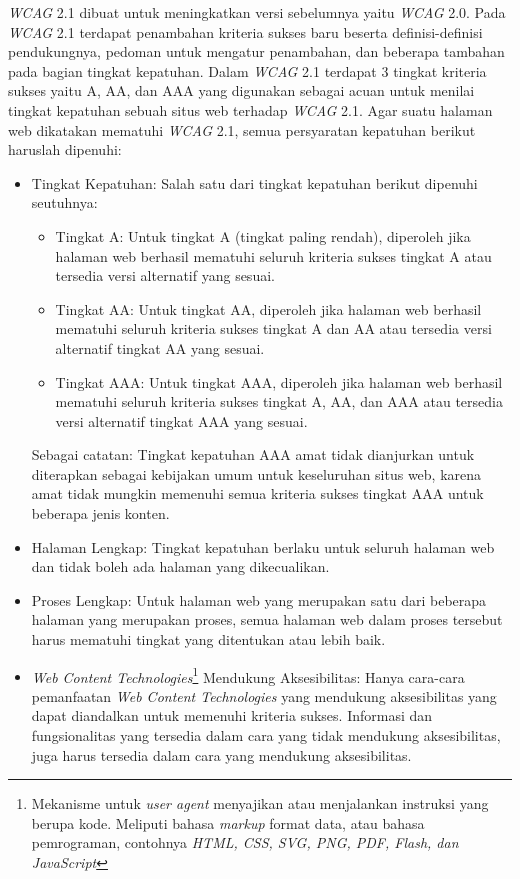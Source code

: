 \textit{WCAG} 2.1 dibuat untuk meningkatkan versi sebelumnya yaitu \textit{WCAG} 2.0. Pada \textit{WCAG} 2.1 terdapat penambahan kriteria sukses baru beserta definisi-definisi pendukungnya, pedoman untuk mengatur penambahan, dan beberapa tambahan pada bagian tingkat kepatuhan. Dalam \textit{WCAG} 2.1 terdapat 3 tingkat kriteria sukses yaitu A, AA, dan AAA yang digunakan sebagai acuan untuk menilai tingkat kepatuhan sebuah situs web terhadap \textit{WCAG} 2.1. Agar suatu halaman web dikatakan mematuhi \textit{WCAG} 2.1, semua persyaratan kepatuhan berikut haruslah dipenuhi:
\begin{itemize}
	\item Tingkat Kepatuhan: Salah satu dari tingkat kepatuhan berikut dipenuhi seutuhnya:
	\begin{itemize}
		\item Tingkat A: Untuk tingkat A (tingkat paling rendah), diperoleh jika halaman web berhasil mematuhi seluruh kriteria sukses tingkat A atau tersedia versi alternatif yang sesuai.
		\item Tingkat AA: Untuk tingkat AA, diperoleh jika halaman web berhasil mematuhi seluruh kriteria sukses tingkat A dan AA atau tersedia versi alternatif tingkat AA yang sesuai.
		\item Tingkat AAA: Untuk tingkat AAA, diperoleh jika halaman web berhasil mematuhi seluruh kriteria sukses tingkat A, AA, dan AAA atau tersedia versi alternatif tingkat AAA yang sesuai.
	\end{itemize}
	Sebagai catatan: Tingkat kepatuhan AAA amat tidak dianjurkan untuk diterapkan sebagai kebijakan umum untuk keseluruhan situs web, karena amat tidak mungkin memenuhi semua kriteria sukses tingkat AAA untuk beberapa jenis konten.
	\item Halaman Lengkap: Tingkat kepatuhan berlaku untuk seluruh halaman web dan tidak boleh ada halaman yang dikecualikan.
	\item Proses Lengkap: Untuk halaman web yang merupakan satu dari beberapa halaman yang merupakan proses, semua halaman web dalam proses tersebut harus mematuhi tingkat yang ditentukan atau lebih baik.
	\item \textit{Web Content Technologies}\footnote{Mekanisme untuk \textit{user agent} menyajikan atau menjalankan instruksi yang berupa kode. Meliputi bahasa \textit{markup} format data, atau bahasa pemrograman, contohnya \textit{HTML, CSS, SVG, PNG, PDF, Flash, dan JavaScript}} Mendukung Aksesibilitas: Hanya cara-cara pemanfaatan \textit{Web Content Technologies} yang mendukung aksesibilitas yang dapat diandalkan untuk memenuhi kriteria sukses. Informasi dan fungsionalitas yang tersedia dalam cara yang tidak mendukung aksesibilitas, juga harus tersedia dalam cara yang mendukung aksesibilitas.

\end{itemize}
